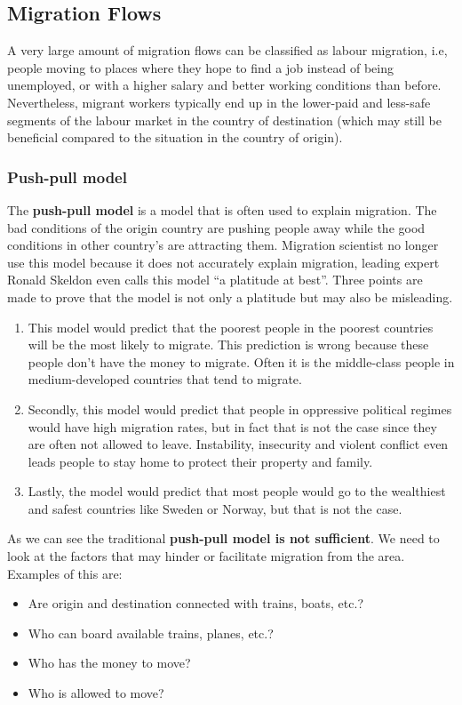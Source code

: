 \documentclass[../summary.tex]{subfiles}
\begin{document}
\subsection{Migration Flows}
A very large amount of migration flows can be classified as labour migration, i.e, people moving to places where they hope to find a job instead of being unemployed, or with a higher salary and better working conditions than before. Nevertheless, migrant workers typically end up in the lower-paid and less-safe segments of the labour market in the country of destination (which may still be beneficial compared to the situation in the country of origin).

\subsubsection{Push-pull model}
The \textbf{push-pull model} is a model that is often used to explain migration. The bad conditions of the origin country are pushing people away while the good conditions in other country's are attracting them. Migration scientist no longer use this model because it does not accurately explain migration, leading expert Ronald Skeldon even calls this model ``a platitude at best''. Three points are made to prove that the model is not only a platitude but may also be misleading.
\begin{enumerate}
	\item This model would predict that the poorest people in the poorest countries will be the most likely to migrate. This prediction is wrong because these people don't have the money to migrate. Often it is the middle-class people in medium-developed countries that tend to migrate.
	\item Secondly, this model would predict that people in oppressive political regimes would have high migration rates, but in fact that is not the case since they are often not allowed to leave. Instability, insecurity and violent conflict even leads people to stay home to protect their property and family.
	\item Lastly, the model would predict that most people would go to the wealthiest and safest countries like Sweden or Norway, but that is not the case.
\end{enumerate}
As we can see the traditional \textbf{push-pull model is not sufficient}. We need to look at the factors that may hinder or facilitate migration from the area. Examples of this are:
\begin{itemize}
	\item Are origin and destination connected with trains, boats, etc.?
	\item Who can board available trains, planes, etc.?
	\item Who has the money to move?
	\item Who is allowed to move?
\end{itemize}
\newpage
\end{document}
